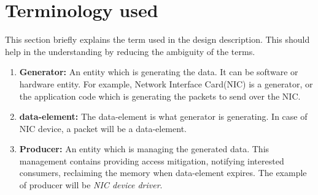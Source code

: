 \documentclass[a4paper,twoside]{report} %
\begin{document}
\section{Terminology used}
This section briefly explains the term used in the design 
description.  This should help in the understanding by reducing 
the ambiguity of the terms.
\begin{enumerate}
  \item \textbf{Generator:} An entity which is generating the data.  It
  can be software or hardware entity.  For example, Network
  Interface Card(NIC) is a generator, or the application code
  which is generating the packets to send over the NIC.
  \item \textbf{data-element:} The data-element is what generator 
  is generating. In case of NIC device, a packet will be a
  data-element.
  \item \textbf{Producer:} An entity which is managing the generated data.
  This management contains providing access mitigation, notifying
  interested consumers, reclaiming the memory when data-element
  expires.  The example of producer will be \textit{NIC device
  driver}.  



\end{enumerate}
\end{document}
